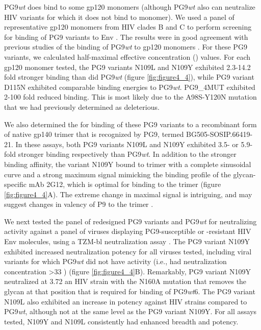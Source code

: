 PG9\textit{wt} does bind to some gp120 monomers (although PG9\textit{wt} also can neutralize HIV variants for which it does not bind to monomer). We used a panel of representative gp120 monomers from HIV clades B and C to perform screening for binding of PG9 variants to Env \citep{Li:2006kv,Li:2005go}. The results were in good agreement with previous studies of the binding of PG9\textit{wt} to gp120 monomers \citep{McLellan:2011dg}. For these PG9 variants, we calculated half-maximal effective concentration (\ec) values. For each gp120 monomer tested, the PG9 variants N109L and N109Y exhibited 2.3-14.2 fold stronger binding than did PG9\textit{wt} (figure \ref{fig:figure4_4}), while PG9 variant D115N exhibited comparable binding energies to PG9\textit{wt}. PG9\_4MUT exhibited 2-100 fold reduced binding. This is most likely due to the A98S-Y120N mutation that we had previously determined as deleterious. 

We also determined the \ec for binding of these PG9 variants to a recombinant form of native gp140 trimer that is recognized by PG9, termed BG505-SOSIP.66419-21. In these assays, both PG9 variants N109L and N109Y exhibited 3.5- or 5.9-fold stronger binding respectively than PG9\textit{wt}. In addition to the stronger binding affinity, the variant N109Y bound to trimer with a complete sinusoidal curve and a strong maximum signal mimicking the binding profile of the glycan-specific mAb 2G12, which is optimal for binding to the trimer \citep{Sanders:2013gm}  (figure \ref{fig:figure4_4}A). The extreme change in maximal signal is intriguing, and may suggest changes in valency of P9 to the trimer \citep{Julien:2013jp}.

We next tested the panel of redesigned PG9 variants and PG9\textit{wt} for neutralizing activity against a panel of viruses displaying PG9-susceptible or -resistant HIV Env molecules, using a TZM-bl neutralization assay \citep{Montefiori:2009hj}. The PG9 variant N109Y exhibited increased neutralization potency for all viruses tested, including viral variants for which PG9\textit{wt} did not have activity (i.e., had neutralization concentration >33 \mcml) (figure \ref{fig:figure4_4}B). Remarkably, PG9 variant N109Y neutralized at 3.72 \mcml an HIV strain with the N160A mutation that removes the glycan at that position that is required for binding of PG9\textit{wt}6. The PG9 variant N109L also exhibited an increase in potency against HIV strains compared to PG9\textit{wt}, although not at the same level as the PG9 variant N109Y. For all assays tested, N109Y and N109L consistently had enhanced breadth and potency.


